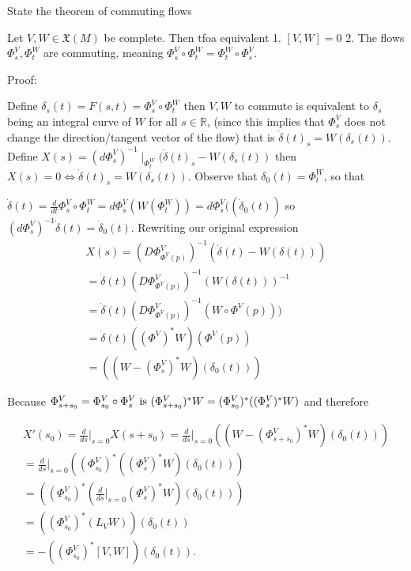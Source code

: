 State the theorem of commuting flows

Let \( V, W \in \mathfrak{X}(M) \) be complete.
Then tfoa equivalent
1. \( [V, W] = 0 \)
2. The flows \( \Phi^V_s, \Phi^W_t \) are commuting, meaning \( \Phi^V_s \circ \Phi^W_t = \Phi^W_t \circ \Phi^V_s \).

Proof:

Define \( \delta_s(t) = F(s, t) = \Phi^V_s \circ \Phi^W_t \)
then \( V, W \) to commute is equivalent to \( \delta_s \) being an integral curve of \( W \)
for all \( s \in \mathbb{R} \), (since this implies that \( \Phi^V_s \) does not change the direction/tangent vector of the flow)
that is
\( \dot{\delta}(t)_s = W(\delta_s(t)) \).
Define
\( X(s) = (d\Phi^V_s)^{-1}\mid_{\Phi^W_t}(\dot{\delta}(t)_s - W(\delta_s(t)) \)
then \( X(s) = 0 \iff \dot{\delta}(t)_s = W(\delta_s(t)) \).
Observe that \( \delta_0(t) = \Phi^W_t \), so that

\( \dot{\delta}(t) = \frac{d}{dt} \Phi^V_s \circ \Phi^W_t = d\Phi^V_s(W(\Phi^W_t)) = d\Phi^V_s((\dot{\delta}_0(t))\)
so
\( (d\Phi^V_s)^{-1}\dot{\delta}(t) = \dot{\delta}_0(t)\).
Rewriting our original expression
\[
\begin{align}
X(s) = (D\Phi^V_{\Phi^V(p)})^{-1} (\dot{\delta}(t) - W(\delta(t))) \\
= \dot{\delta}(t) (D\Phi^V_{\Phi^V(p)})^{-1} (W(\delta(t)))^{-1} \\
= \dot{\delta}(t) (D\Phi^V_{\Phi^V(p)})^{-1} (W \circ \Phi^V (p))) \\
= \dot{\delta}(t) ((\Phi^V)^* W) (\Phi^V (p)) \\
= ((W - (\Phi^V_s)^* W) (\delta_0(t)))
\end{align}
\]

Because \(\Phi^V_{s + s_0} = \Phi^V_{s_0} \circ \Phi^V_s$ is $(\Phi^V_{s + s_0})^* W = (\Phi^V_{s_0})^* ((\Phi^V_s)^* W)\) and therefore

\[
\begin{align}
X'(s_0) = \frac{d}{ds} \bigg|_{s=0} X(s + s_0) 
= \frac{d}{ds} \bigg|_{s=0} ((W - (\Phi^V_{s + s_0})^* W) (\delta_0(t))) \\
= \frac{d}{ds} \bigg|_{s=0} ((\Phi^V_{s_0})^* ((\Phi^V_s)^* W) (\delta_0(t))) \\
= ((\Phi^V_{s_0})^*( \frac{d}{ds} \bigg|_{s=0} (\Phi^V_s)^* W) (\delta_0(t))) \\
= ((\Phi^V_{s_0})^*(L_V W)) (\delta_0 (t)) \\
= - ((\Phi^V_{s_0})^*[V, W]) (\delta_0(t)).
\end{align}
\]

